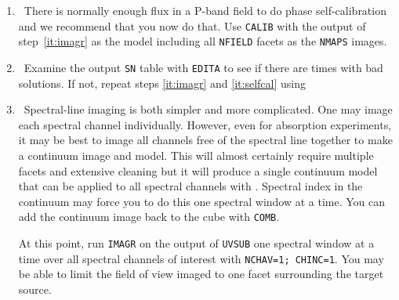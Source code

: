 \begin{enumerate}
\vfill\eject
\item\ There is normally enough flux in a P-band field to do
  phase self-calibration and we recommend that you now do that.  Use
  {\tt CALIB} with the output of step~\ref{it:imagr} as the model
  including all {\tt NFIELD} facets as the {\tt NMAPS} images.
  \label{it:selfcal}

\item\ Examine the output {\tt SN} table with {\tt EDITA} to see if
  there are times with bad solutions.  If not, repeat steps
  \ref{it:imagr} and \ref{it:selfcal} using

\item\ Spectral-line imaging is both simpler and more complicated.
  One may image each spectral channel individually.  However, even for
  absorption experiments, it may be best to image all channels free of
  the spectral line together to make a continuum image and model.
  This will almost certainly require multiple facets and extensive
  cleaning but it will produce a single continuum model that can be
  applied to all spectral channels with {\tt {}}\@.
  Spectral index in the continuum may force you to do this one
  spectral window at a time.  You can add the continuum image back to
  the cube with {\tt COMB}\@.

  At this point, run {\tt IMAGR} on the output of {\tt UVSUB} one
  spectral window at a time over all spectral channels of interest
  with {\tt NCHAV=1; CHINC=1}\@.  You may be able to limit the field
  of view imaged to one facet surrounding the target source.


\end{enumerate}
